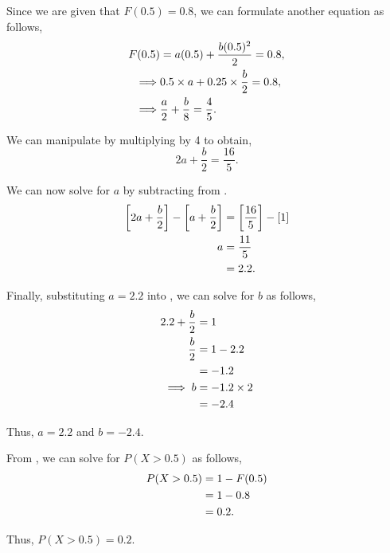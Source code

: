 \begin{subquestions}
\begin{subsubquestions}
Since we are given that $F(0.5)=0.8$, we can formulate another equation as follows,
\begin{align}
	F(0.5) & = a(0.5) + \frac{b(0.5)^2}{2} = 0.8, \nonumber \\
  \implies &  0.5 \times a + 0.25 \times \frac{b}{2} = 0.8, \nonumber \\
  \implies & \frac{a}{2} + \frac{b}{8} = \frac{4}{5}. \label{2015:q4:eqn:crv2}
\end{align}

We can manipulate  by multiplying by 4 to obtain,
\begin{equation}
	2a + \frac{b}{2} = \frac{16}{5}. \label{2015:q4:eqn:crv3}
\end{equation}

We can now solve for $a$ by subtracting  from .
\begin{align}
	\left[2a + \frac{b}{2} \right] - \left[a + \frac{b}{2} \right] & = \left[\frac{16}{5} \right] - [1] \nonumber \\
	a & = \frac{11}{5} \nonumber \\
	  & = 2.2.
\end{align}

Finally, substituting $a=2.2$ into , we can solve for $b$ as follows,
\begin{align}
	2.2 + \frac{b}{2} & = 1 \nonumber \\
	\frac{b}{2} & = 1 - 2.2 \nonumber \\
	            & = -1.2 \nonumber \\
	\implies  b & = -1.2 \times 2 \nonumber \\
	            & = -2.4
\end{align}

Thus, $a=2.2$ and $b=-2.4$.


\subsubquestion

From , we can solve for $P(X>0.5)$ as follows,
\begin{align}
	P(X>0.5) & = 1 - F(0.5) \nonumber \\
	         & = 1 - 0.8 \nonumber \\
	         & = 0.2.
\end{align}

Thus, $P(X>0.5)=0.2$.
\end{subsubquestions}



\end{subquestions}

